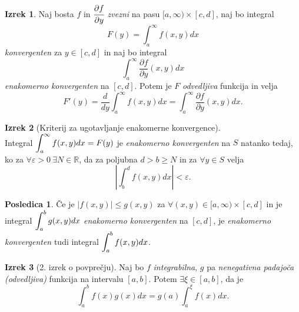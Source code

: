 \documentclass[11pt]{article}
\theoremstyle{definition}
\theoremstyle{definition}
\theoremstyle{definition}
\newtheorem{izrek}{Izrek}[section]
\newtheorem*{posledica}{Posledica}
\begin{document}
\begin{izrek}

Naj bosta $f$ in $\cfrac{\partial f}{\partial y}$ \textit{zvezni} na pasu $[a, \infty) \times [c, d]$, naj bo integral
$$F(y) = \int_a^{\infty} f(x, y) dx$$
\textit{konvergenten} za $y \in [c, d]$ in naj bo integral
$$\int_a^{\infty} \frac{\partial f}{\partial y}(x, y) dx$$
\textit{enakomerno konvergenten} na $[c, d]$. Potem je $F$ \textit{odvedljiva} funkcija in velja
$$F'(y) = \frac{d}{dy} \int_a^{\infty} f(x, y) dx = \int_a^{\infty} \frac{\partial f}{\partial y}(x, y) dx.$$

\end{izrek}
\vspace{0.5cm}

\begin{izrek}[Kriterij za ugotavljanje enakomerne konvergence]
~ \\
Integral $\mathlarger{\int_a^{\infty} f(x, y) dx} = F(y)$ je \textit{enakomerno konvergenten} na $S$ natanko tedaj, ko za $\forall \varepsilon > 0 ~\exists N \in \mathbb{R}$, da za poljubna $d > b \geq N$ in za $\forall y \in S$ velja
$$\left| \int_b^d f(x, y) dx \right| < \varepsilon.$$

\end{izrek}
\vspace{0.5cm}

\begin{posledica}

Če je $|f(x, y)| \leq g(x, y)$ za $\forall (x, y) \in [a, \infty) \times [c, d]$ in je integral $\mathlarger{\int_a^b g(x, y) dx}$ \textit{enakomerno konvergenten} na $[c, d]$, je \textit{enakomerno konvergenten} tudi integral $\mathlarger{\int_a^b f(x, y) dx}$.

\end{posledica}
\vspace{0.5cm}

\begin{izrek}[2. izrek o povprečju]

Naj bo $f$ \textit{integrabilna}, $g$ pa \textit{nenegativna padajoča (odvedljiva)} funkcija na intervalu $[a, b]$. Potem $\exists \xi \in [a, b]$, da je
$$\int_a^b f(x) g(x) dx = g(a) \int_a^{\xi} f(x) dx.$$

\end{izrek}
\vspace{0.5cm}

\end{document}
